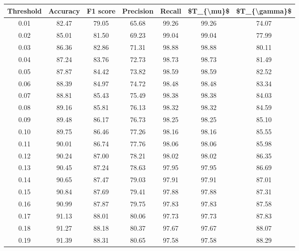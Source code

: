 \begin{tabular}{|c|c|c|c|c|c|c|}
\hline
 Threshold &  Accuracy &  F1 score &  Precision &  Recall &  \$T\_\{\textbackslash mu\}\$ &  \$T\_\{\textbackslash gamma\}\$ \\
\hline
      0.01 &     82.47 &     79.05 &      65.68 &   99.26 &      99.26 &         74.07 \\
      0.02 &     85.01 &     81.50 &      69.23 &   99.04 &      99.04 &         77.99 \\
      0.03 &     86.36 &     82.86 &      71.31 &   98.88 &      98.88 &         80.11 \\
      0.04 &     87.24 &     83.76 &      72.73 &   98.73 &      98.73 &         81.49 \\
      0.05 &     87.87 &     84.42 &      73.82 &   98.59 &      98.59 &         82.52 \\
      0.06 &     88.39 &     84.97 &      74.72 &   98.48 &      98.48 &         83.34 \\
      0.07 &     88.81 &     85.43 &      75.49 &   98.38 &      98.38 &         84.03 \\
      0.08 &     89.16 &     85.81 &      76.13 &   98.32 &      98.32 &         84.59 \\
      0.09 &     89.48 &     86.17 &      76.73 &   98.25 &      98.25 &         85.10 \\
      0.10 &     89.75 &     86.46 &      77.26 &   98.16 &      98.16 &         85.55 \\
      0.11 &     90.01 &     86.74 &      77.76 &   98.06 &      98.06 &         85.98 \\
      0.12 &     90.24 &     87.00 &      78.21 &   98.02 &      98.02 &         86.35 \\
      0.13 &     90.45 &     87.24 &      78.63 &   97.95 &      97.95 &         86.69 \\
      0.14 &     90.65 &     87.47 &      79.03 &   97.91 &      97.91 &         87.01 \\
      0.15 &     90.84 &     87.69 &      79.41 &   97.88 &      97.88 &         87.31 \\
      0.16 &     90.99 &     87.87 &      79.75 &   97.83 &      97.83 &         87.58 \\
      0.17 &     91.13 &     88.01 &      80.06 &   97.73 &      97.73 &         87.83 \\
      0.18 &     91.27 &     88.18 &      80.37 &   97.67 &      97.67 &         88.07 \\
      0.19 &     91.39 &     88.31 &      80.65 &   97.58 &      97.58 &         88.29 \\

\end{tabular}
